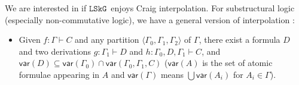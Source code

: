 \documentclass[a4paper,UKenglish,cleveref, autoref, thm-restate, anonymous]{lipics-v2021}
\newcommand{\vdG}{\vdash}
\newcommand{\vdL}{\vdash_{L}}
\newcommand{\NL}{$\mathtt{NL}$}
\newcommand{\LSkNL}{$\mathtt{LSkNL}$}
\newcommand{\LSkG}{$\mathtt{LSkG}$}
\newcommand{\vars}[1]{\mathsf{var}(#1)}
\begin{document}

We are interested in if \LSkG~enjoys Craig interpolation.
For substructural logic (especially non-commutative logic), we have a general version of interpolation \cite{ono:proof:nonclassical:1998}:
\begin{itemize}
  \item[\ ] Given $f : \Gamma \vdash C$ and any partition $\langle \Gamma_0, \Gamma_1, \Gamma_2 \rangle$ of $\Gamma$, there exist a formula $D$ and two derivations $g : \Gamma_1 \vdash D$ and $h : \Gamma_0, D, \Gamma_1 \vdash C$, and $\vars{D} \subseteq \vars{\Gamma_0} \cap \vars{\Gamma_0, \Gamma_1, C}$ ($\vars{A}$ is the set of atomic formulae appearing in $A$ and $\vars{\Gamma}$ means $\bigcup \vars{A_i}$ for $A_i \in \Gamma$).
\end{itemize}
\end{document}
